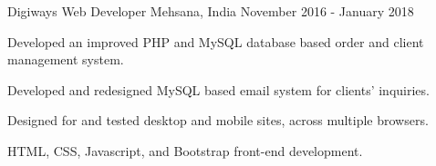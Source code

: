 \begin{cventries}
 \cventry
    {Digiways} %
    {Web Developer} %
    {Mehsana, India} %
    {November 2016 - January 2018} %
    {
      \begin{cvitems} %
        \item {Developed an improved PHP and MySQL database based order and client management system.}
        \item {Developed and redesigned MySQL based email system for clients' inquiries.}
        \item {Designed for and tested desktop and mobile sites, across multiple browsers.}
        \item {HTML, CSS, Javascript, and Bootstrap front-end development.}
      \end{cvitems}
    }

\end{cventries}
